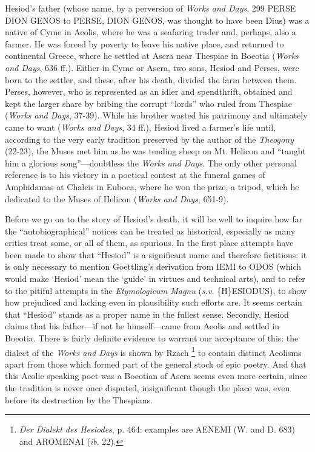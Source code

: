 Hesiod’s father (whose name, by a perversion of \emph{Works and Days},
299 PERSE DION GENOS to PERSE, DION GENOS, was thought to have been Dius) was a
native of Cyme in Aeolis, where he was a seafaring trader and, perhaps, also a
farmer. He was forced by poverty to leave his native place, and returned to
continental Greece, where he settled at Ascra near Thespiae in Boeotia
(\emph{Works and Days}, 636 ff.). Either in Cyme or Ascra, two sons, Hesiod and
Perses, were born to the settler, and these, after his death, divided the farm
between them. Perses, however, who is represented as an idler and spendthrift,
obtained and kept the larger share by bribing the corrupt “lords”
who ruled from Thespiae (\emph{Works and Days}, 37-39). While his brother
wasted his patrimony and ultimately came to want (\emph{Works and Days}, 34
ff.), Hesiod lived a farmer’s life until, according to the very early
tradition preserved by the author of the \emph{Theogony} (22-23), the Muses met
him as he was tending sheep on Mt. Helicon and “taught him a glorious
song”—doubtless the \emph{Works and Days}. The only other personal
reference is to his victory in a poetical contest at the funeral games of
Amphidamas at Chalcis in Euboea, where he won the prize, a tripod, which he
dedicated to the Muses of Helicon (\emph{Works and Days}, 651-9).

Before we go on to the story of Hesiod’s death, it will be well to
inquire how far the “autobiographical” notices can be treated as
historical, especially as many critics treat some, or all of them, as spurious.
In the first place attempts have been made to show that “Hesiod” is
a significant name and therefore fictitious: it is only necessary to mention
Goettling’s derivation from IEMI to ODOS (which would make
‘Hesiod’ mean the ‘guide’ in virtues and technical
arts), and to refer to the pitiful attempts in the \emph{Etymologicum Magnu}
(\emph{s.v.} \{H\}ESIODUS), to show how prejudiced and lacking even in
plausibility such efforts are. It seems certain that “Hesiod”
stands as a proper name in the fullest sense. Secondly, Hesiod claims that his
father—if not he himself—came from Aeolis and settled in Boeotia.
There is fairly definite evidence to warrant our acceptance of this: the
dialect of the \emph{Works and Days} is shown by Rzach \footnote{\emph{Der Dialekt des
Hesiodes}, p. 464: examples are AENEMI (W. and D. 683) and AROMENAI
(\emph{ib}. 22).} to
contain distinct Aeolisms apart from those which formed part of the general
stock of epic poetry. And that this Aeolic speaking poet was a Boeotian of
Ascra seems even more certain, since the tradition is never once disputed,
insignificant though the place was, even before its destruction by the
Thespians.

